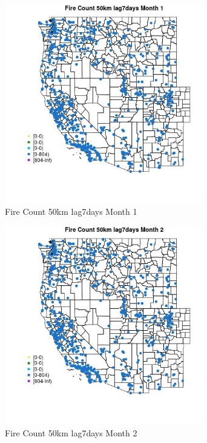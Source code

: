 \begin{figure} 
\centering  
\includegraphics[width=0.77\textwidth]{Code_Outputs/Report_ML_input_PM25_Step4_part_f_de_duplicated_aves_prioritize_24hr_obswNAs_MapObsMo1Fire_Count_50km_lag7days.jpg} 
\caption{\label{fig:Report_ML_input_PM25_Step4_part_f_de_duplicated_aves_prioritize_24hr_obswNAsMapObsMo1Fire_Count_50km_lag7days}Fire Count 50km lag7days Month 1} 
\end{figure} 
 

\begin{figure} 
\centering  
\includegraphics[width=0.77\textwidth]{Code_Outputs/Report_ML_input_PM25_Step4_part_f_de_duplicated_aves_prioritize_24hr_obswNAs_MapObsMo2Fire_Count_50km_lag7days.jpg} 
\caption{\label{fig:Report_ML_input_PM25_Step4_part_f_de_duplicated_aves_prioritize_24hr_obswNAsMapObsMo2Fire_Count_50km_lag7days}Fire Count 50km lag7days Month 2} 
\end{figure} 
 

